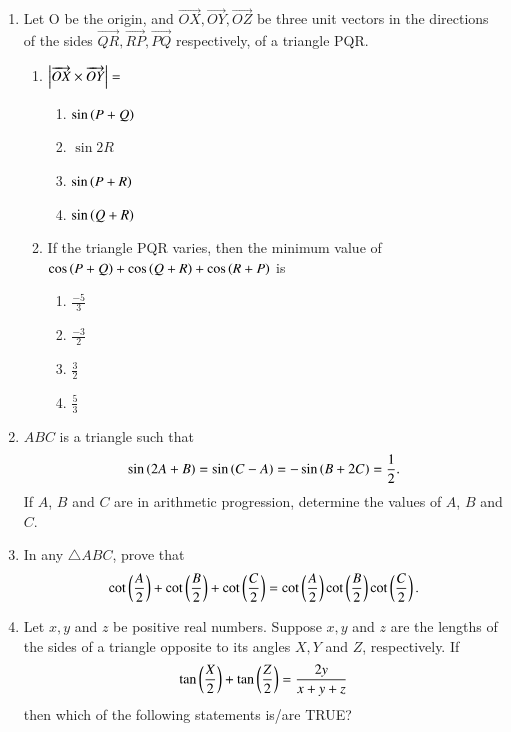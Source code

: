 \begin{enumerate}[label=\thesubsection.\arabic*,ref=\thesubsection.\theenumi]
\begin{multicols}{4}
\end{multicols}
\item
Let O be the origin, and $\overrightarrow{OX},\overrightarrow{OY},\overrightarrow{OZ}$ be three unit vectors in the directions of the sides $\overrightarrow{QR},\overrightarrow{RP},\overrightarrow{PQ}$ respectively, of a triangle PQR.\hfill{}
\begin{enumerate}
	\item $\left\vert\overrightarrow{OX}\times\overrightarrow{OY}\right\vert=$
	\begin{multicols}{4}
\begin{enumerate}
		\item$\sin\left(P+Q\right)$ 
		\item$\sin2R$
		\item$\sin\left(P+R\right)$
		\item$\sin\left(Q+R\right)$
	\end{enumerate}
\end{multicols}
%
	\item If the triangle PQR varies, then the minimum value of $\cos\left(P+Q\right)+\cos\left(Q+R\right)+\cos\left(R+P\right)$ is
	\begin{multicols}{4}
\begin{enumerate}
		\item$\frac{-5}{3}$
		\item$\frac{-3}{2}$
		\item$\frac{3}{2}$
		\item$\frac{5}{3}$
	\end{enumerate}
\end{multicols}
	\end{enumerate}
\item $ABC$ is a triangle such that 
\hfill{}
$$	\sin{\ensuremath{\left(2A+B\right)}}=\sin{\ensuremath{\left(C-A\right)}}=-\sin{\ensuremath{\left(B+2C\right)}}=\frac{1}{2}
.$$
If $A$, $B$ and $C$ are in arithmetic progression, determine the values of $A$, $B$ and $C$.
\item In any $\triangle ABC$, prove that 
\hfill{}
$$
\cot \left(\frac{A}{2}\right)+\cot \left(\frac{B}{2}\right)+\cot \left(\frac{C}{2}\right)=\cot \left(\frac{A}{2}\right)\cot \left(\frac{B}{2}\right)\cot \left(\frac{C}{2}\right).
$$
\item   Let $x, y$ and $z$ be positive real numbers. Suppose $x, y$ and $z$ are the lengths of the sides of a triangle opposite to its angles $X, Y$ and $Z$, respectively. If 
\begin{align*}
	\tan\left(\frac{X}{2}\right) + \tan\left(\frac{Z}{2}\right) = \frac{2y}{x + y + z}
\end{align*}
    then which of the following statements is/are TRUE?

\end{enumerate}
